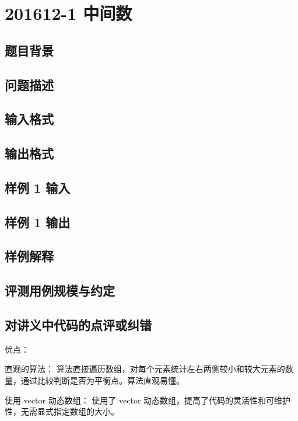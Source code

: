 \section{201612-1 中间数}

\subsection{题目背景}

\subsection{问题描述}

\subsection{输入格式}

\subsection{输出格式}

\subsection{样例 1 输入}

\subsection{样例 1 输出}

\subsection{样例解释}

\subsection{评测用例规模与约定}

\subsection{对讲义中代码的点评或纠错}
 
优点：

直观的算法： 算法直接遍历数组，对每个元素统计左右两侧较小和较大元素的数量，通过比较判断是否为平衡点。算法直观易懂。

使用 vector 动态数组： 使用了 vector 动态数组，提高了代码的灵活性和可维护性，无需显式指定数组的大小。


